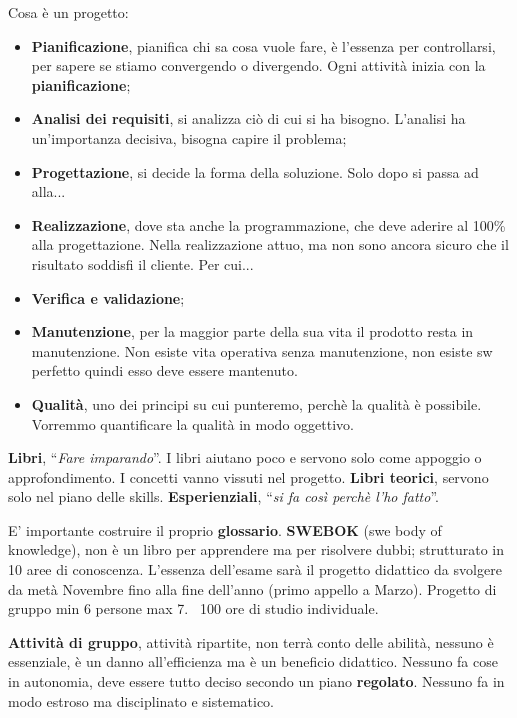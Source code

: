 Cosa è un progetto:

\begin{itemize}

	\item \textbf{Pianificazione}, pianifica chi sa cosa vuole fare, è l'essenza per controllarsi, per sapere se stiamo convergendo o divergendo. Ogni attività inizia con la \textbf{pianificazione};
	\item \textbf{Analisi dei requisiti}, si analizza ciò di cui si ha bisogno. L'analisi ha un'importanza decisiva, bisogna capire il problema;
	\item \textbf{Progettazione}, si decide la forma della soluzione. Solo dopo si passa ad alla...
	\item \textbf{Realizzazione}, dove sta anche la programmazione, che deve aderire al 100\% alla progettazione. Nella realizzazione attuo, ma non sono ancora sicuro che il risultato soddisfi il cliente. Per cui...
	\item \textbf{Verifica e validazione};
	\item \textbf{Manutenzione}, per la maggior parte della sua vita il prodotto resta in manutenzione. Non esiste vita operativa senza manutenzione, non esiste sw perfetto quindi esso deve essere mantenuto.
	\item \textbf{Qualità}, uno dei principi su cui punteremo, perchè la qualità è possibile. Vorremmo quantificare la qualità in modo oggettivo.

\end{itemize}

\textbf{Libri}, “\textit{Fare imparando}”. I libri aiutano poco e servono solo come appoggio o approfondimento. I concetti vanno vissuti nel progetto.
\textbf{Libri teorici}, servono solo nel piano delle skills.
\textbf{Esperienziali}, “\textit{si fa così perchè l'ho fatto}”.

E' importante costruire il proprio \textbf{glossario}. \textbf{SWEBOK} (swe body of knowledge), non è un libro per apprendere ma per risolvere dubbi; strutturato in 10 aree di conoscenza. L'essenza dell'esame sarà il progetto didattico da svolgere da metà Novembre fino alla fine dell'anno (primo appello a Marzo). Progetto di gruppo min 6 persone max 7. ~100 ore di studio individuale.

\textbf{Attività di gruppo}, attività ripartite, non terrà conto delle abilità, nessuno è essenziale, è un danno all'efficienza ma è un beneficio didattico. Nessuno fa cose in autonomia, deve essere tutto deciso secondo un piano \textbf{regolato}. Nessuno fa in modo estroso ma disciplinato e sistematico.

